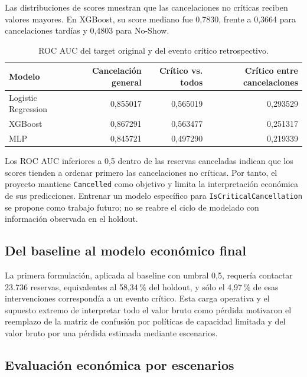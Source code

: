 Las distribuciones de scores muestran que las cancelaciones no críticas
reciben valores mayores. En XGBoost, su score mediano fue 0,7830, frente a
0,3664 para cancelaciones tardías y 0,4803 para No-Show.

\begin{table}[htbp]
    \centering
    \caption{ROC AUC del target original y del evento crítico retrospectivo.}
    \label{tab:critical-retrospective-auc}
    \begin{tabular}{lrrr}
        \toprule
        Modelo & Cancelación general & Crítico vs. todos & Crítico entre cancelaciones \\
        \midrule
        Logistic Regression & 0,855017 & 0,565019 & 0,293529 \\
        XGBoost & 0,867291 & 0,563477 & 0,251317 \\
        MLP & 0,845721 & 0,497290 & 0,219339 \\
        \bottomrule
    \end{tabular}
\end{table}

Los ROC AUC inferiores a 0,5 dentro de las reservas canceladas indican que los
scores tienden a ordenar primero las cancelaciones no críticas. Por tanto, el
proyecto mantiene \texttt{Cancelled} como objetivo y limita la interpretación
económica de sus predicciones. Entrenar un modelo específico para
\texttt{IsCriticalCancellation} se propone como trabajo futuro; no se reabre
el ciclo de modelado con información observada en el holdout.

\subsection{Del baseline al modelo económico final}

La primera formulación, aplicada al baseline con umbral 0,5, requería contactar
23.736 reservas, equivalentes al 58,34\,\% del holdout, y sólo el 4,97\,\% de
esas intervenciones correspondía a un evento crítico. Esta carga operativa y
el supuesto extremo de interpretar todo el valor bruto como pérdida motivaron
el reemplazo de la matriz de confusión por políticas de capacidad limitada y
del valor bruto por una pérdida estimada mediante escenarios.

\subsection{Evaluación económica por escenarios}

